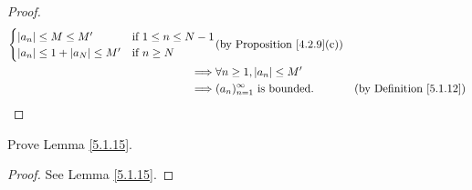 \begin{proof}
\begin{align*}
\begin{cases}
                       \abs*{a_n} \leq M \leq M'              & \text{if } 1 \leq n \leq N - 1 \\
                       \abs*{a_n} \leq 1 + \abs*{a_N} \leq M' & \text{if } n \geq N
                   \end{cases} & \text{(by Proposition \ref{4.2.9}(c))}                                          \\
        \implies & \forall n \geq 1, \abs*{a_n} \leq M'                                                                             \\
        \implies & (a_n)_{n = 1}^\infty \text{ is bounded}.                                   & \text{(by Definition \ref{5.1.12})}
    \end{align*}
\end{proof}

\exercisesection

\begin{exercise}\label{ex 5.1.1}
    Prove Lemma \ref{5.1.15}.
\end{exercise}

\begin{proof}
    See Lemma \ref{5.1.15}.
\end{proof}